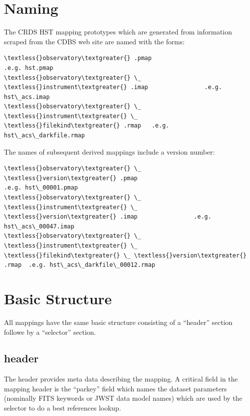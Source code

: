 \documentclass[letterpaper,10pt,english]{sphinxmanual}
\begin{document}
\section{Naming}
\label{rmap_syntax:naming}
The CRDS HST mapping prototypes which are generated from information scraped from
the CDBS web site are named with the forms:

\begin{Verbatim}[commandchars=\\\{\}]
\textless{}observatory\textgreater{} .pmap                               .e.g. hst.pmap
\textless{}observatory\textgreater{} \_ \textless{}instrument\textgreater{} .imap                .e.g. hst\_acs.imap
\textless{}observatory\textgreater{} \_ \textless{}instrument\textgreater{} \_ \textless{}filekind\textgreater{} .rmap   .e.g. hst\_acs\_darkfile.rmap
\end{Verbatim}

The names of subsequent derived mappings include a version number:

\begin{Verbatim}[commandchars=\\\{\}]
\textless{}observatory\textgreater{} \_ \textless{}version\textgreater{} .pmap                               .e.g. hst\_00001.pmap
\textless{}observatory\textgreater{} \_ \textless{}instrument\textgreater{} \_ \textless{}version\textgreater{} .imap                .e.g. hst\_acs\_00047.imap
\textless{}observatory\textgreater{} \_ \textless{}instrument\textgreater{} \_ \textless{}filekind\textgreater{} \_ \textless{}version\textgreater{} .rmap  .e.g. hst\_acs\_darkfile\_00012.rmap
\end{Verbatim}


\section{Basic Structure}
\label{rmap_syntax:basic-structure}
All mappings have the same basic structure consisting of a ``header'' section followe by a ``selector'' section.


\subsection{header}
\label{rmap_syntax:header}
The header provides meta data describing the mapping.  A critical field in the mapping header is the ``parkey''
field which names the dataset parameters (nominally FITS keywords or JWST data model names) which are used by
the selector to do a best references lookup.
\end{document}
